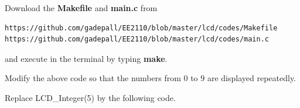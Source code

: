 \documentclass[journal,12pt,twocolumn]{IEEEtran}
\begin{document}
\solution Download the \textbf{Makefile} and \textbf{main.c} from
%
\begin{lstlisting}
https://github.com/gadepall/EE2110/blob/master/lcd/codes/Makefile	
https://github.com/gadepall/EE2110/blob/master/lcd/codes/main.c
\end{lstlisting}
and execute in the terminal by typing \textbf{make}.
%
\begin{problem}
Modify the above code so that the numbers from 0 to 9 are displayed repeatedly.
\end{problem}
\solution Replace LCD\_Integer(5) by the following code.

%
%
%
%
%
%
%
%
%
%
%
%
%
%
\end{document}
